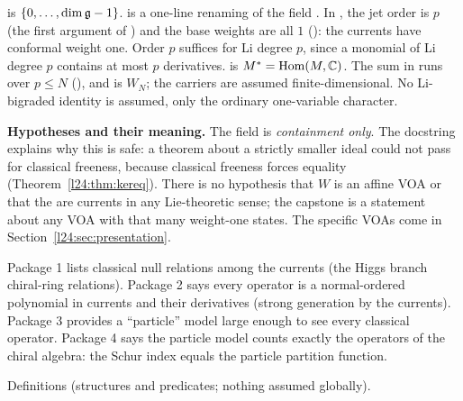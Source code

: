 \begin{dictionary}
 is $\{0,\dots,\dim\mathfrak g-1\}$.  is a
one-line renaming of the field . In , the jet order is $p$ (the first
argument of ) and the base weights are all $1$ ():
the currents have conformal weight one. Order $p$ suffices for Li degree $p$, since a monomial of Li degree $p$
contains at most $p$ derivatives.  is $M^*=\operatorname{Hom}(M,{\mathbb{C}})$. The sum in
 runs over $p\le N$ (), and  is
$W_N$; the carriers are assumed finite-dimensional. No Li-bigraded identity is assumed, only the
ordinary one-variable character.

\textbf{Hypotheses and their meaning.} The  field is \emph{containment only}. The docstring
explains why this is safe: a theorem about a strictly smaller ideal could not pass for classical
freeness, because classical freeness forces equality (Theorem~\ref{l24:thm:kereq}). There is no
hypothesis that $W$ is an affine VOA or that the  are currents in any Lie-theoretic sense; the
capstone is a statement about any VOA with that many weight-one states. The specific VOAs come in
Section~\ref{l24:sec:presentation}.
\end{dictionary}

\begin{physics}
Package 1 lists classical null relations among the currents (the Higgs branch chiral-ring relations).
Package 2 says every operator is a normal-ordered polynomial in currents and their derivatives (strong
generation by the currents). Package 3 provides a ``particle'' model large enough to see every classical
operator. Package 4 says the particle model counts exactly the operators of the chiral algebra: the Schur
index equals the particle partition function.
\end{physics}

\begin{status}
Definitions (structures and predicates; nothing assumed globally).
\end{status}

